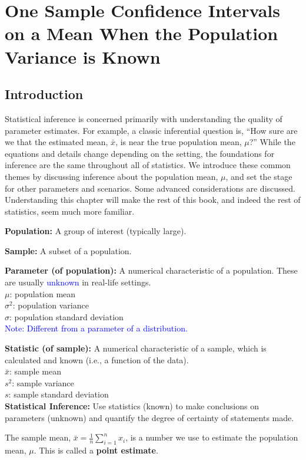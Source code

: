 
\chapter{One Sample Confidence Intervals on a Mean When the Population Variance is Known}
\section{Introduction}
Statistical inference is concerned primarily with understanding the quality of parameter estimates. For example, a classic inferential question is, ``How sure are we that the estimated mean, $\bar{x}$, is near the true population mean, $\mu$?'' While the equations and details change depending on the setting, the foundations for inference are the same throughout all of statistics. We introduce these common themes by discussing inference about the population mean, $\mu$, and set the stage for other parameters and scenarios. Some advanced considerations are discussed. Understanding this chapter will make the rest of this book, and indeed the rest of statistics, seem much more familiar.

\begin{definition}
\textbf{Population:} A group of interest (typically large). 
\vspace{0.1em}

\textbf{Sample:} A subset of a population. 

\textbf{Parameter (of population):} A numerical characteristic of a population. These are usually \textcolor{blue}{unknown} in real-life settings. \\
\hspace*{1em} $\mu$: population mean \\
\hspace*{1em} $\sigma^2$: population variance \\
\hspace*{1em} $\sigma$: population standard deviation \\
\textcolor{blue}{Note: Different from a parameter of a distribution.} 

\textbf{Statistic (of sample):} A numerical characteristic of a sample, which is calculated and known (i.e., a function of the data). \\
\hspace*{1em} $\bar{x}$: sample mean \\
\hspace*{1em} $s^2$: sample variance \\
\hspace*{1em} $s$: sample standard deviation \\

\textbf{Statistical Inference:} Use statistics (known) to make conclusions on parameters (unknown) and quantify the degree of certainty of statements made.

\end{definition}
\noindent
The sample mean, $\bar{x} = \frac{1}{n} \sum_{i=1}^{n} x_i$, is a number we use to estimate the population mean, $\mu$. This is called a \textbf{point estimate}. %

